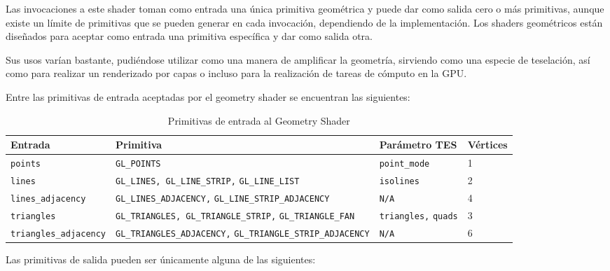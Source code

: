 Las invocaciones a este shader toman como entrada una única primitiva geométrica
y puede dar como salida cero o más primitivas, aunque existe un límite de
primitivas que se pueden generar en cada invocación, dependiendo de la
implementación. Los shaders geométricos están diseñados para aceptar como
entrada una primitiva específica y dar como salida otra. 

Sus usos varían bastante, pudiéndose utilizar como una manera de amplificar la
geometría, sirviendo como una especie de teselación, así como para realizar un
renderizado por capas o incluso para la realización de tareas de cómputo en la
GPU. 

Entre las primitivas de entrada aceptadas por el geometry shader se encuentran
las siguientes:

\begin{table}[h]
		\begin{tabular}{|m{4cm}|m{7cm}|m{2.2cm}|m{1.5cm}|}

			\hline
			Entrada & Primitiva & Parámetro TES & Vértices\\
			\hline

			\verb|points| & \verb|GL_POINTS| & \verb|point_mode| & 1 \\
			\hline

			\verb|lines| & \verb|GL_LINES, GL_LINE_STRIP,| \verb|GL_LINE_LIST| &
			\verb|isolines| & 2\\

			\hline

			\verb|lines_adjacency| & \verb|GL_LINES_ADJACENCY,|
			\verb|GL_LINE_STRIP_ADJACENCY| & \verb|N/A| & 4\\

			\hline

			\verb|triangles| & \verb|GL_TRIANGLES, GL_TRIANGLE_STRIP,|
			\verb|GL_TRIANGLE_FAN| & \verb|triangles,| \verb|quads| & 3 \\

			\hline

			\verb|triangles_adjacency| & \verb|GL_TRIANGLES_ADJACENCY,|
			\verb|GL_TRIANGLE_STRIP_ADJACENCY| & \verb|N/A| & 6 \\

			\hline
		\end{tabular}
		\caption{Primitivas de entrada al Geometry Shader}
		\label{tabla3.1}
\end{table}

Las primitivas de salida pueden ser únicamente alguna de las siguientes:

